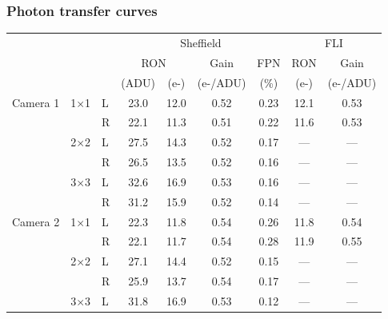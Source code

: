 \begin{colsection}
\begin{colsection}
\newpage
\subsubsection{Photon transfer curves}

\begin{table}[p]
    \begin{center}
        \begin{tabular}{lll|cccc|cc} %
                     &            &   & \multicolumn{4}{c|}{Sheffield}            & \multicolumn{2}{c}{FLI} \\
                     &            &   & \multicolumn{2}{c}{RON} & Gain     & FPN  & RON       & Gain        \\
                     &            &   & (ADU)      & (e-)       & (e-/ADU) & (\%) & (e-)      & (e-/ADU)    \\
            \midrule
            Camera 1 & 1$\times$1 & L & 23.0       & 12.0       & 0.52     & 0.23 & 12.1      & 0.53        \\
                     &            & R & 22.1       & 11.3       & 0.51     & 0.22 & 11.6      & 0.53        \\
                     & 2$\times$2 & L & 27.5       & 14.3       & 0.52     & 0.17 & ---       & ---         \\
                     &            & R & 26.5       & 13.5       & 0.52     & 0.16 & ---       & ---         \\
                     & 3$\times$3 & L & 32.6       & 16.9       & 0.53     & 0.16 & ---       & ---         \\
                     &            & R & 31.2       & 15.9       & 0.52     & 0.14 & ---       & ---         \\
            \midrule
            Camera 2 & 1$\times$1 & L & 22.3       & 11.8       & 0.54     & 0.26 & 11.8      & 0.54        \\
                     &            & R & 22.1       & 11.7       & 0.54     & 0.28 & 11.9      & 0.55        \\
                     & 2$\times$2 & L & 27.1       & 14.4       & 0.52     & 0.15 & ---       & ---         \\
                     &            & R & 25.9       & 13.7       & 0.54     & 0.17 & ---       & ---         \\
                     & 3$\times$3 & L & 31.8       & 16.9       & 0.53     & 0.12 & ---       & ---         \\

\end{tabular}
\end{center}
\end{table}
\end{colsection}
\end{colsection}
